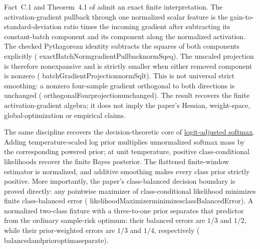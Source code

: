 \documentclass[11pt]{article}
\newcommand{\leanname}[1]{{\scriptsize\ttfamily
  \def\_{\textunderscore\allowbreak}#1}}
\begin{document}
Fact~C.1 and Theorem~4.1 of \cite{santurkar2018} admit an exact finite
interpretation. The activation-gradient pullback through one normalized scalar
feature is the gain-to-standard-deviation ratio times the incoming gradient
after subtracting its constant-batch component and its component along the
normalized activation. The checked Pythagorean identity subtracts the squares
of both components explicitly
(\leanname{exactBatchNorm\_gradientPullback\_normSq\_eq}).
The unscaled projection is therefore nonexpansive and is strictly smaller when
either removed component is nonzero
(\leanname{batchGradientProjection\_normSq\_lt}). This is not universal
strict smoothing: a nonzero four-sample gradient orthogonal to both directions
is unchanged
(\leanname{orthogonalFour\_projection\_unchanged}).
The result recovers the finite activation-gradient algebra; it does not imply
the paper's Hessian, weight-space, global-optimization or empirical claims.

The same discipline recovers the decision-theoretic core of
\href{https://arxiv.org/abs/2311.06460}{logit-adjusted softmax}. Adding
temperature-scaled log prior multiplies unnormalized softmax mass by the corresponding
powered prior; at unit temperature, positive class-conditional likelihoods recover the
finite Bayes posterior. The flattened finite-window estimator is normalized, and
additive smoothing makes every class prior strictly positive. More importantly, the
paper's class-balanced decision boundary is proved directly: any pointwise maximizer of
class-conditional likelihood minimizes finite class-balanced error
(\leanname{likelihoodMaximizer\_minimizes\_classBalancedError}).
A normalized two-class fixture with a three-to-one prior separates that predictor from
the ordinary sample-risk optimum: their balanced errors are $1/3$ and $1/2$, while
their prior-weighted errors are $1/3$ and $1/4$, respectively
(\leanname{balanced\_and\_prior\_optima\_separate}).
\end{document}
